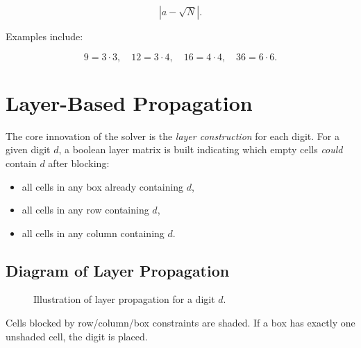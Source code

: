 \documentclass[11pt]{article}
\begin{document}
\[
|a - \sqrt{N}|.
\]


Examples include:


\[
9 = 3 \cdot 3,\quad 12 = 3 \cdot 4,\quad 16 = 4 \cdot 4,\quad 36 = 6 \cdot 6.
\]



\section{Layer-Based Propagation}
The core innovation of the solver is the \emph{layer construction} for each digit.
For a given digit $d$, a boolean layer matrix is built indicating which empty cells
\emph{could} contain $d$ after blocking:
\begin{itemize}
    \item all cells in any box already containing $d$,
    \item all cells in any row containing $d$,
    \item all cells in any column containing $d$.
\end{itemize}

\subsection{Diagram of Layer Propagation}
\begin{figure}[h]
\centering
{}
\caption{Illustration of layer propagation for a digit $d$.}
\label{fig:layer}
\end{figure}


Cells blocked by row/column/box constraints are shaded.  
If a box has exactly one unshaded cell, the digit is placed.
\end{document}
